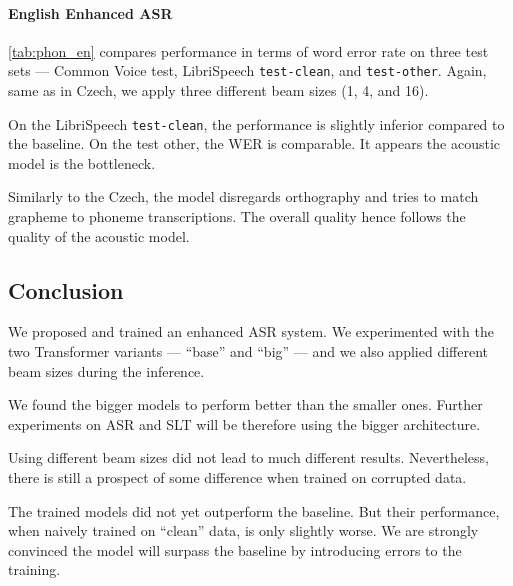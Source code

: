 \paragraph{English Enhanced ASR}
\cref{tab:phon_en} compares performance in terms of word error rate on three test sets --- Common Voice test, LibriSpeech \texttt{test-clean}, and \texttt{test-other}. Again, same as in Czech, we apply three different beam sizes (1, 4, and 16).

On the LibriSpeech \texttt{test-clean}, the performance is slightly inferior compared to the baseline. On the test other, the WER is comparable. It appears the acoustic model is the bottleneck. 

Similarly to the Czech, the model disregards orthography and tries to match grapheme to phoneme transcriptions. The overall quality hence follows the quality of the acoustic model.

\subsection{Conclusion}
\label{easr:conclusion}
We proposed and trained an enhanced ASR system. We experimented with the two Transformer variants --- ``base'' and ``big'' --- and we also applied different beam sizes during the inference. 

We found the bigger models to perform better than the smaller ones. Further experiments on ASR and SLT will be therefore using the bigger architecture.

Using different beam sizes did not lead to much different results. Nevertheless, there is still a prospect of some difference when trained on corrupted data.

The trained models did not yet outperform the baseline. But their performance, when naively trained on ``clean'' data, is only slightly worse. We are strongly convinced the model will surpass the baseline by introducing errors to the training. %
